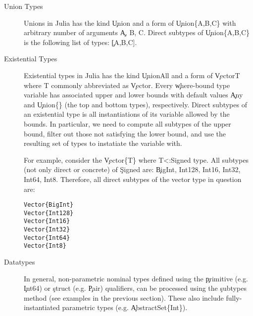 \begin{description}

  \item[Union Types]
        Unions in Julia has the kind \c{Union} and a form of \c{Union\{A,B,C\}}
        with arbitrary number of arguments \c{A, B, C}.
        Direct subtypes of \c{Union\{A,B,C\}} is the following list of types: \c{[A,B,C]}.

  \item[Existential Types]
        Existential types in Julia has the kind \c{UnionAll} and a form of
        \c{Vector{T} where T} commonly abbreviated as \c{Vector}. Every
        \c{where}-bound type variable has associated upper and lower bounds with
        default values \c{Any} and \c{Union\{\}} (the top and bottom types),
        respectively. Direct subtypes of an existential type is all
        instantiations of its variable allowed by the bounds. In particular, we
        need to compute all subtypes of the upper bound, filter out those not
        satisfying the lower bound, and use the resulting set of types to
        instatiate the variable with.

        For example, consider the \c{Vector\{T\} where T<:Signed} type.
        All subtypes (not only direct or concrete) of \c{Signed} are: \c{BigInt, Int128, Int16, Int32, Int64, Int8}. Therefore, all direct subtypes of the vector type in question are:

\begin{minipage}{.92\textwidth}
        \begin{lstlisting}
Vector{BigInt}
Vector{Int128}
Vector{Int16}
Vector{Int32}
Vector{Int64}
Vector{Int8}
        \end{lstlisting}
\end{minipage}


  \item[Datatypes]
        In general, non-parametric nominal types defined using the \c{primitive} (e.g. \c{Int64}) or
        \c{struct} (e.g. \c{Pair}) qualifiers,  can be processed
        using the \c{subtypes} method (see examples in the previous section).%
        These also include fully-instantiated parametric types
        (e.g. \c{AbstractSet\{Int\}}).


\end{description}
